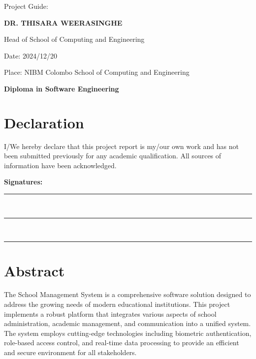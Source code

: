 \documentclass[12pt,a4paper]{report}
\begin{document}
\begin{titlepage}
    {\Large Project Guide:}
    
    \vspace{0.3cm}
    
    {\Large\bfseries DR. THISARA WEERASINGHE}
    
    {\large Head of School of Computing and Engineering}
    
    \vfill %
    
    {\large Date: 2024/12/20}
    
    {\large Place: NIBM Colombo School of Computing and Engineering}
    
    \vspace{0.5cm}
    
    {\Large\bfseries Diploma in Software Engineering}
    
\end{titlepage}

\newpage
{} %


\section*{Declaration}
I/We hereby declare that this project report is my/our own work and has not been submitted previously for any academic qualification. All sources of information have been acknowledged.

\vspace{2cm}
\noindent\textbf{Signatures:}

\vspace{2cm}
\noindent\rule{6cm}{0.4pt}\\
\noindent\rule{6cm}{0.4pt}\\
\noindent\rule{6cm}{0.4pt}

\newpage
\section*{Abstract}
The School Management System is a comprehensive software solution designed to address the growing needs of modern educational institutions. This project implements a robust platform that integrates various aspects of school administration, academic management, and communication into a unified system. The system employs cutting-edge technologies including biometric authentication, role-based access control, and real-time data processing to provide an efficient and secure environment for all stakeholders.
\end{document}
